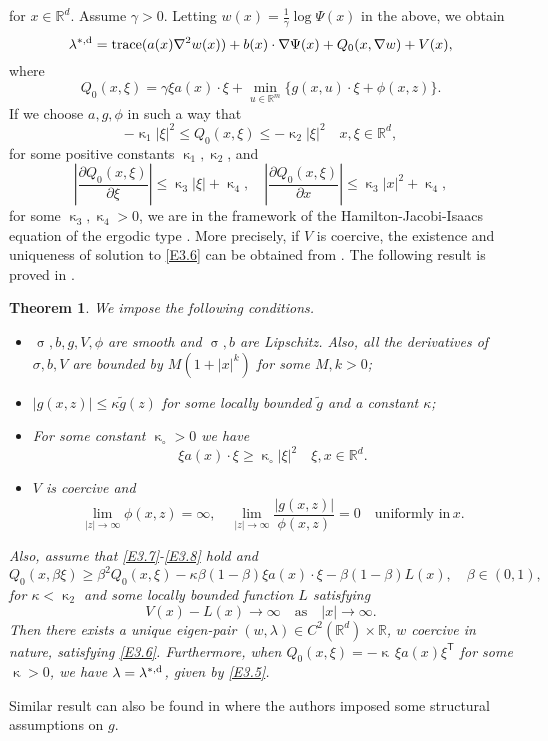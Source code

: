 \documentclass[notitlepage,11pt,reqno]{amsart}
\numberwithin{equation}{section}
\theoremstyle{plain}
\newtheorem{theorem}{Theorem}[section]
\theoremstyle{definition}
\theoremstyle{remark}
\newcommand{\lamstrdf}{\lambda^{*,{\rm d}}}
\newcommand{\RR}{\mathds{R}} %
\newcommand{\Rd}{{\mathds{R}^{d}}}
\newcommand{\abs}[1]{\lvert#1\rvert}
\newcommand{\transp}{^{\mathsf{T}}}
\DeclareMathOperator*{\trace}{trace}
\newcommand{\grad}{\nabla}
\begin{document}
for $x\in\Rd$.
Assume $\gamma>0$. Letting $w(x)=\frac{1}{\gamma} \log\Psi(x)$ in the above, we obtain
\begin{equation}\label{E3.6}
\lamstrdf= \trace(a(x)\grad^2 w(x)) + b(x)\cdot \grad\Psi(x) + Q_0(x, \grad w) + V(x),
\end{equation}
where
$$Q_0(x, \xi)= \gamma \xi a(x) \cdot \xi + \min_{u\in\RR^m} \{ g(x, u)\cdot \xi + \phi(x, z) \}.$$
If we choose $a, g, \phi$ in such a way that
\begin{equation}\label{E3.7}
-\upkappa_1\abs{\xi}^2\leq Q_0(x, \xi)\leq -\upkappa_2\abs{\xi}^2\quad x, \xi\in\Rd,
\end{equation}
for some positive constants $\upkappa_1, \upkappa_2$, and 
\begin{equation}\label{E3.8}
\left|\frac{\partial Q_0(x, \xi)}{\partial \xi}\right|\leq \upkappa_3 \abs{\xi}+\upkappa_4, \quad \left|\frac{\partial Q_0(x, \xi)}{\partial x}\right|\leq \upkappa_3 \abs{x}^2+\upkappa_4,
\end{equation}
for some $\upkappa_3, \upkappa_4>0$, we are in the framework of the Hamilton-Jacobi-Isaacs equation of the ergodic type \cite{MR1173120}. More precisely, if $V$ is coercive, the existence and uniqueness of solution to \eqref{E3.6} 
can be obtained from  \cite{MR1173120}. The following result is proved in \cite[Theorem~3.4]{MR1372906}.
\begin{theorem}
We impose the following conditions.
\begin{itemize}
\item[(i)] $\upsigma, b, g, V, \phi$ are smooth and $\upsigma, b$ are Lipschitz. Also, all the derivatives of $\sigma, b, V$ are bounded by $M(1+\abs{x}^k)$ for some $M, k > 0$;
\item[(ii)] $|g(x, z)|\leq \kappa \tilde{g}(z)$ for some locally bounded $\tilde{g}$ and a constant $\kappa$;
\item[(iii)] For some constant $\upkappa_\circ>0$ we have 
$$\xi a(x)\cdot \xi\geq \upkappa_\circ \abs{\xi}^2\quad \xi,x \in\Rd.$$
\item[(iii)] $V$ is coercive and 
$$\lim_{|z|\to\infty}\phi(x, z)=\infty, \quad \lim_{|z|\to\infty}\frac{\abs{g(x, z)}}{\phi(x, z)}=0\quad \text{uniformly in}\, x.$$
\end{itemize}
Also, assume that \eqref{E3.7}-\eqref{E3.8} hold and
$$Q_0(x, \beta \xi)\geq \beta^2 Q_0(x, \xi) - \kappa \beta(1-\beta) \xi a(x)\cdot\xi -\beta(1-\beta) L(x), \quad \beta\in (0, 1),$$
for $\kappa<\upkappa_2$ and some locally bounded function $L$ satisfying
 $$ V(x)-L(x)\to \infty\quad \text{as}\quad |x|\to\infty.$$
Then there exists a unique eigen-pair  $(w, \lambda)\in C^2(\Rd)\times\RR$, $w$ coercive in nature, satisfying \eqref{E3.6}. Furthermore, when
$Q_0(x, \xi)=-\upkappa\, \xi a(x)\xi\transp$ for some $\upkappa>0$,
we have $\lambda=\lamstrdf$, given by \eqref{E3.5}.
\end{theorem}
Similar result can also be found in \cite[Theorem~3.3]{MR1715337} where the authors imposed some structural assumptions on $g$.
\end{document}
